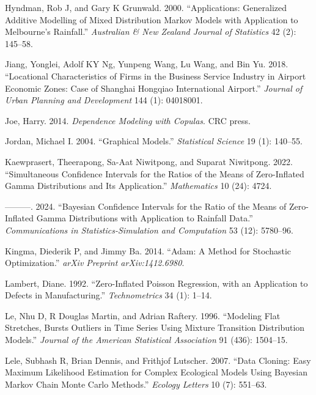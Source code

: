 \documentclass[
  letterpaper,
  double,
  12pt,
  1.0in]{beavtex}
\newlength{\cslhangindent}
\newenvironment{CSLReferences}[2] %
 {\begin{list}{}{%
  \setlength{\itemindent}{0pt}
  \setlength{\leftmargin}{0pt}
  \setlength{\parsep}{0pt}
  \ifodd #1
   \setlength{\leftmargin}{\cslhangindent}
   \setlength{\itemindent}{-1\cslhangindent}
  \fi
  \setlength{\itemsep}{#2\baselineskip}}}
 {\end{list}}
\begin{document}
\begin{CSLReferences}{1}{0}
Hyndman, Rob J, and Gary K Grunwald. 2000. {``Applications: Generalized
Additive Modelling of Mixed Distribution Markov Models with Application
to Melbourne's Rainfall.''} \emph{Australian \& New Zealand Journal of
Statistics} 42 (2): 145--58.

Jiang, Yonglei, Adolf KY Ng, Yunpeng Wang, Lu Wang, and Bin Yu. 2018.
{``Locational Characteristics of Firms in the Business Service Industry
in Airport Economic Zones: Case of Shanghai Hongqiao International
Airport.''} \emph{Journal of Urban Planning and Development} 144 (1):
04018001.

Joe, Harry. 2014. \emph{Dependence Modeling with Copulas}. CRC press.

Jordan, Michael I. 2004. {``Graphical Models.''} \emph{Statistical
Science} 19 (1): 140--55.

Kaewprasert, Theerapong, Sa-Aat Niwitpong, and Suparat Niwitpong. 2022.
{``Simultaneous Confidence Intervals for the Ratios of the Means of
Zero-Inflated Gamma Distributions and Its Application.''}
\emph{Mathematics} 10 (24): 4724.

---------. 2024. {``Bayesian Confidence Intervals for the Ratio of the
Means of Zero-Inflated Gamma Distributions with Application to Rainfall
Data.''} \emph{Communications in Statistics-Simulation and Computation}
53 (12): 5780--96.

Kingma, Diederik P, and Jimmy Ba. 2014. {``Adam: A Method for Stochastic
Optimization.''} \emph{arXiv Preprint arXiv:1412.6980}.

Lambert, Diane. 1992. {``Zero-Inflated Poisson Regression, with an
Application to Defects in Manufacturing.''} \emph{Technometrics} 34 (1):
1--14.

Le, Nhu D, R Douglas Martin, and Adrian Raftery. 1996. {``Modeling Flat
Stretches, Bursts Outliers in Time Series Using Mixture Transition
Distribution Models.''} \emph{Journal of the American Statistical
Association} 91 (436): 1504--15.

Lele, Subhash R, Brian Dennis, and Frithjof Lutscher. 2007. {``Data
Cloning: Easy Maximum Likelihood Estimation for Complex Ecological
Models Using Bayesian Markov Chain Monte Carlo Methods.''} \emph{Ecology
Letters} 10 (7): 551--63.


\end{CSLReferences}
\end{document}
